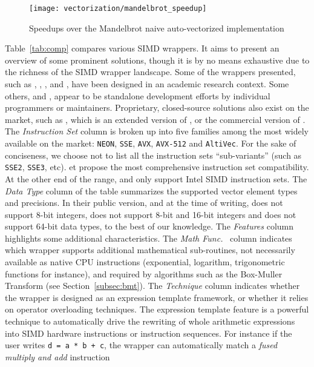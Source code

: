 \begin{figure}
\centering
\texttt{[image: vectorization/mandelbrot\_speedup]}
\caption{Speedups over the Mandelbrot naive auto-vectorized implementation}
\label{fig:fractal}
\end{figure}

Table~\ref{tab:comp} compares various SIMD wrappers. It aims to present an
overview of some prominent solutions, though it is by no means exhaustive due to
the richness of the SIMD wrapper landscape. Some of the wrappers presented, such
as \MIPP, \Vc, \BoostSIMD, \VCL and \TSIMD, have been designed in an academic
research context. Some others, \simdpp and \xsimd, appear to be standalone
development efforts by individual programmers or maintainers. Proprietary,
closed-source solutions also exist on the market, such as \bSIMD, which is an
extended version of \BoostSIMD, or the commercial version of \VCL. The
\textit{Instruction Set} column is broken up into five families among the most
widely available on the market: \verb|NEON|, \verb|SSE|, \verb|AVX|,
\verb|AVX-512| and \verb|AltiVec|. For the sake of conciseness, we choose not to
list all the instruction sets ``sub-variants'' (such as \verb|SSE2|,
\verb|SSE3|, etc). \simdpp et \bSIMD propose the most comprehensive instruction
set compatibility. At the other end of the range, \xsimd and \BoostSIMD only
support Intel SIMD instruction sets. The \textit{Data Type} column of the table
summarizes the supported vector element types and precisions. In their public
version, and at the time of writing, \Vc does not support 8-bit integers, \xsimd
does not support 8-bit and 16-bit integers and \TSIMD does not support 64-bit
data types, to the best of our knowledge. The \textit{Features} column
highlights some additional characteristics. The \textit{Math Func.}~ column
indicates which wrapper supports additional mathematical sub-routines, not
necessarily available as native CPU instructions (exponential, logarithm,
trigonometric functions for instance), and required by algorithms such as the
Box-Muller Transform (see Section~\ref{subsec:bmt}). The \textit{\Cxx Technique}
column indicates whether the wrapper is designed as an expression template
framework, or whether it relies on operator overloading techniques. The
expression template feature is a powerful technique to automatically drive the
rewriting of whole arithmetic expressions into SIMD hardware instructions or
instruction sequences. For instance if the user writes \verb|d = a * b + c|, the
wrapper can automatically match a \emph{fused multiply and add} instruction
